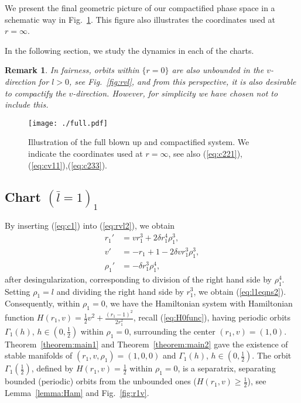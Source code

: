 \documentclass[reqno,12pt]{amsart}
\newcommand{\eqlab}[1]{\label{eq:#1}}
\renewcommand{\eqref}[1]{(\ref{eq:#1})}
\newcommand{\figref}[1]{Fig.~\ref{fig:#1}}
\newcommand{\figlab}[1]{\label{fig:#1}}
\newcommand{\lemmaref}[1]{Lemma~\ref{lemma:#1}}
\newcommand{\thmref}[1]{Theorem~\ref{theorem:#1}}
\newtheorem{remark}[theorem]{Remark}
\numberwithin{equation}{section}
\begin{document}
We present the final geometric picture of our compactified phase space in a schematic way in \figref{full}. This figure also illustrates the coordinates used at $r=\infty$. 

In the following section, we study the dynamics in each of the charts. 

\begin{remark}
 In fairness, orbits within $\{r=0\}$ are also unbounded in the $v$-direction for $l>0$, see \figref{rvl}, and from this perspective, it is also desirable to compactify the $v$-direction. However, for simplicity we have chosen not to include this. %
\end{remark}

\begin{figure}[h!]
 	\begin{center}
 		{\texttt{[image: ./full.pdf]}}
 		\caption{Illustration of the full blown up and compactified system. We indicate the coordinates used at $r=\infty$, see also \eqref{c221}, \eqref{cv11},\eqref{c233}. }\figlab{full}
 	\end{center}
 \end{figure}
 

\subsection{Chart $(\bar l=1)_1$}
By inserting \eqref{c1} into \eqref{rvl2}, we obtain
\begin{equation}\eqlab{l1eqns20}
\begin{aligned}
 r_1' &=vr_1^3 +2\delta r_1^4 \rho_1^3,\\
 v' &= -{r_1+1}-2\delta vr_1^3 \rho_1^3,\\
  \rho_1' &=-\delta r_1^3 \rho_1^4,
\end{aligned}
\end{equation}
after desingularization, corresponding to division of the right hand side by $\rho_1^4$. Setting $\rho_1=l$ and dividing the right hand side by $r_1^3$, we obtain \eqref{l1eqns2}. Consequently, within $\rho_1=0$, we have the Hamiltonian system with Hamiltonian function $H(r_1,v)=\frac12 v^2 +\frac{(r_1-1)^2}{2r_1^2}$, recall \eqref{H0func}, having periodic orbits $\Gamma_1(h)$, $h\in \left(0,\frac12\right)$ within $\rho_1=0$, surrounding the center $(r_1,v)=(1,0)$. \thmref{main1} and \thmref{main2} gave the existence of stable manifolds of $(r_1,v,\rho_1)=(1,0,0)$ and $\Gamma_1(h)$, $h\in \left(0,\frac12\right)$. The orbit $\Gamma_1\!\left(\frac12\right)$, defined by $H(r_1,v)=\frac12$ within $\rho_1=0$, is a separatrix, separating bounded (periodic) orbits from the unbounded ones ($H(r_1,v)\ge \frac12$), see \lemmaref{Ham} and \figref{r1v}.
\end{document}
